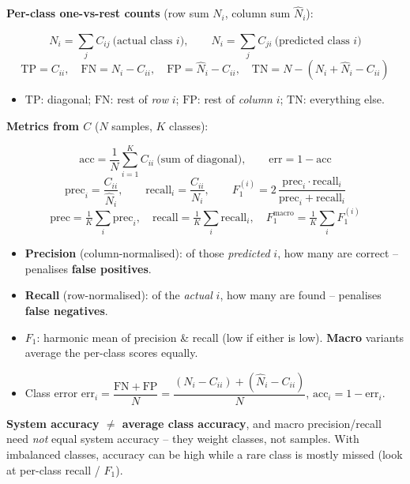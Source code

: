 \documentclass[10pt,a4paper]{article}
\begin{document}
	\textbf{Per-class one-vs-rest counts} (row sum $N_i$, column sum $\hat N_i$):
	\begin{formulabox}
		\[
		N_i = \sum_j C_{ij}\ \text{(actual class }i\text{)}, \qquad
		\hat N_i = \sum_j C_{ji}\ \text{(predicted class }i\text{)}
		\]
		\[
		\mathrm{TP}=C_{ii},\quad
		\mathrm{FN}=N_i-C_{ii},\quad
		\mathrm{FP}=\hat N_i-C_{ii},\quad
		\mathrm{TN}=N-(N_i+\hat N_i-C_{ii})
		\]
	\end{formulabox}
	\begin{itemize}[leftmargin=*]
		\item $\mathrm{TP}$: diagonal; $\mathrm{FN}$: rest of \emph{row} $i$; $\mathrm{FP}$: rest of \emph{column} $i$; $\mathrm{TN}$: everything else.
	\end{itemize}

	\textbf{Metrics from $C$} ($N$ samples, $K$ classes):
	\begin{formulabox}
		\[
		\mathrm{acc} = \frac{1}{N}\sum_{i=1}^{K} C_{ii}\ \text{(sum of diagonal)}, \qquad
		\mathrm{err} = 1-\mathrm{acc}
		\]
		\[
		\mathrm{prec}_i = \frac{C_{ii}}{\hat N_i}, \qquad
		\mathrm{recall}_i = \frac{C_{ii}}{N_i}, \qquad
		F_1^{(i)} = 2\,\frac{\mathrm{prec}_i\cdot\mathrm{recall}_i}{\mathrm{prec}_i+\mathrm{recall}_i}
		\]
		\[
		\mathrm{prec}=\tfrac{1}{K}\textstyle\sum_i \mathrm{prec}_i,\quad
		\mathrm{recall}=\tfrac{1}{K}\textstyle\sum_i \mathrm{recall}_i,\quad
		F_1^{\text{macro}}=\tfrac{1}{K}\textstyle\sum_i F_1^{(i)}
		\]
	\end{formulabox}
	\begin{itemize}[leftmargin=*]
		\item \textbf{Precision} (column-normalised): of those \emph{predicted} $i$, how many are correct -- penalises \textbf{false positives}.
		\item \textbf{Recall} (row-normalised): of the \emph{actual} $i$, how many are found -- penalises \textbf{false negatives}.
		\item \textbf{$F_1$}: harmonic mean of precision \& recall (low if either is low). \textbf{Macro} variants average the per-class scores equally.
		\item Class error $\mathrm{err}_i = \dfrac{\mathrm{FN}+\mathrm{FP}}{N} = \dfrac{(N_i-C_{ii})+(\hat N_i-C_{ii})}{N}$, \; $\mathrm{acc}_i = 1-\mathrm{err}_i$.
	\end{itemize}

	\begin{importantbox}
		\textbf{System accuracy $\ne$ average class accuracy}, and macro precision/recall need \emph{not} equal system accuracy -- they weight classes, not samples. With imbalanced classes, accuracy can be high while a rare class is mostly missed (look at per-class recall / $F_1$).
	\end{importantbox}
\end{document}
